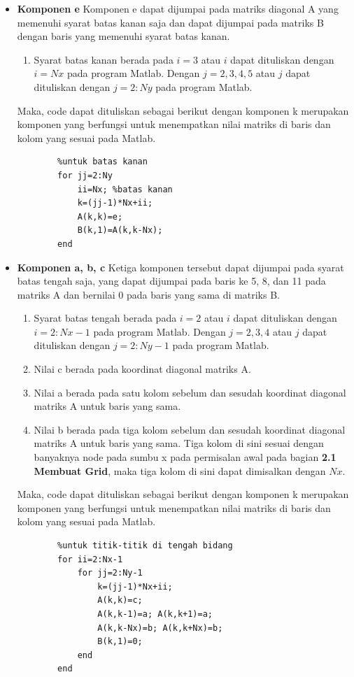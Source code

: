 \documentclass{article}
\begin{document}
\begin{itemize}
    \item \textbf{Komponen e}
    \subitem Komponen e dapat dijumpai pada matriks diagonal A yang memenuhi syarat batas kanan saja dan dapat dijumpai pada matriks B dengan baris yang memenuhi syarat batas kanan.
    \begin{enumerate}
        \item Syarat batas kanan berada pada \(i=3\) atau \(i\) dapat dituliskan dengan \(i=Nx\) pada program Matlab. Dengan \(j=2,3,4,5\) atau \(j\) dapat dituliskan dengan \(j=2:Ny\) pada program Matlab. 
    \end{enumerate}
    Maka, code dapat dituliskan sebagai berikut dengan komponen k merupakan komponen yang berfungsi untuk menempatkan nilai matriks di baris dan kolom yang sesuai pada Matlab. 
     \begin{lstlisting}
        %untuk batas kanan
        for jj=2:Ny
            ii=Nx; %batas kanan
            k=(jj-1)*Nx+ii;
            A(k,k)=e;
            B(k,1)=A(k,k-Nx);
        end
    \end{lstlisting}
    
    \item \textbf{Komponen a, b, c}
    \subitem Ketiga komponen tersebut dapat dijumpai pada syarat batas tengah saja, yang dapat dijumpai pada baris ke 5, 8, dan 11 pada matriks A dan bernilai 0 pada baris yang sama di matriks B.
    \begin{enumerate}
        \item Syarat batas tengah berada pada \(i=2\) atau \(i\) dapat dituliskan dengan \(i=2:Nx-1\) pada program Matlab. Dengan \(j=2,3,4\) atau \(j\) dapat dituliskan dengan \(j=2:Ny-1\) pada program Matlab. 
        \item Nilai c berada pada koordinat diagonal matriks A.
        \item Nilai a berada pada satu kolom sebelum dan sesudah koordinat diagonal matriks A untuk baris yang sama.
        \item Nilai b berada pada tiga kolom sebelum dan sesudah koordinat diagonal matriks A untuk baris yang sama. Tiga kolom di sini sesuai dengan banyaknya node pada sumbu x pada permisalan awal pada bagian \textbf{2.1 Membuat Grid}, maka tiga kolom di sini dapat dimisalkan dengan \(Nx\).
    \end{enumerate}
    Maka, code dapat dituliskan sebagai berikut dengan komponen k merupakan komponen yang berfungsi untuk menempatkan nilai matriks di baris dan kolom yang sesuai pada Matlab. 
    \begin{lstlisting}
        %untuk titik-titik di tengah bidang
        for ii=2:Nx-1
            for jj=2:Ny-1
                k=(jj-1)*Nx+ii;
                A(k,k)=c;
                A(k,k-1)=a; A(k,k+1)=a;
                A(k,k-Nx)=b; A(k,k+Nx)=b;
                B(k,1)=0;
            end
        end
    \end{lstlisting}
\end{itemize}
\end{document}
